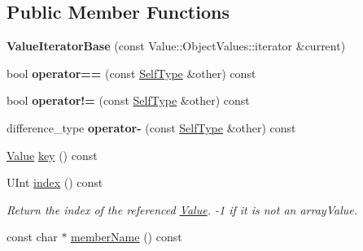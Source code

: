 \subsection*{Public Member Functions}
\begin{DoxyCompactItemize}
\item 
\hypertarget{class_json_1_1_value_iterator_base_a640e990e5f03a96fd650122a2906f59d}{{\bfseries Value\+Iterator\+Base} (const Value\+::\+Object\+Values\+::iterator \&current)}\label{class_json_1_1_value_iterator_base_a640e990e5f03a96fd650122a2906f59d}

\item 
\hypertarget{class_json_1_1_value_iterator_base_afc656672ac28502f640ade32c38c1b56}{bool {\bfseries operator==} (const \hyperlink{class_json_1_1_value_iterator_base}{Self\+Type} \&other) const }\label{class_json_1_1_value_iterator_base_afc656672ac28502f640ade32c38c1b56}

\item 
\hypertarget{class_json_1_1_value_iterator_base_a18c2dd42e0bb989ace141bfe9de52792}{bool {\bfseries operator!=} (const \hyperlink{class_json_1_1_value_iterator_base}{Self\+Type} \&other) const }\label{class_json_1_1_value_iterator_base_a18c2dd42e0bb989ace141bfe9de52792}

\item 
\hypertarget{class_json_1_1_value_iterator_base_ab786787fcad68ca5e8745aaf520fa17f}{difference\+\_\+type {\bfseries operator-\/} (const \hyperlink{class_json_1_1_value_iterator_base}{Self\+Type} \&other) const }\label{class_json_1_1_value_iterator_base_ab786787fcad68ca5e8745aaf520fa17f}

\item 
\hyperlink{class_json_1_1_value}{Value} \hyperlink{class_json_1_1_value_iterator_base_aa2ff5e79fc96acd4c3cd288e92614fc7}{key} () const 
\item 
\hypertarget{class_json_1_1_value_iterator_base_aa90591f5f7f8d2f06cc4605816b53738}{U\+Int \hyperlink{class_json_1_1_value_iterator_base_aa90591f5f7f8d2f06cc4605816b53738}{index} () const }\label{class_json_1_1_value_iterator_base_aa90591f5f7f8d2f06cc4605816b53738}

\begin{DoxyCompactList}\small\item\em Return the index of the referenced \hyperlink{class_json_1_1_value}{Value}. -\/1 if it is not an array\+Value. \end{DoxyCompactList}\item 
const char $\ast$ \hyperlink{class_json_1_1_value_iterator_base_ac05e6bda279201f09803b7f347ddf057}{member\+Name} () const 
\end{DoxyCompactItemize}
